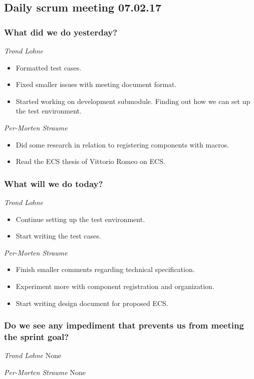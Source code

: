 \documentclass{article}
\begin{document}
\begin{center}
\subsection*{Daily scrum meeting 07.02.17}
\end{center}
\bigskip


\subsubsection*{What did we do yesterday?}

\noindent\textit{Trond Lohne}
\begin{itemize}
    \item
    Formatted test cases.

    \item
    Fixed smaller issues with meeting document format.

    \item
    Started working on development submodule. 
    Finding out how we can set up the test environment.
\end{itemize}

\medskip

\noindent\textit{Per-Morten Straume}
\begin{itemize}
    \item
    Did some research in relation to registering components with macros.

    \item
    Read the ECS thesis of Vittorio Romeo on ECS.
\end{itemize}


\subsubsection*{What will we do today?}

\noindent\textit{Trond Lohne}
\begin{itemize}
    \item
    Continue setting up the test environment.

    \item
    Start writing the test cases.
\end{itemize}

\medskip

\noindent\textit{Per-Morten Straume}
\begin{itemize}
    \item
    Finish smaller comments regarding technical specification.

    \item
    Experiment more with component registration and organization.

    \item
    Start writing design document for proposed ECS.
\end{itemize}

\subsubsection*{Do we see any impediment that prevents us from meeting the sprint goal?}

\noindent\textit{Trond Lohne}
None

\medskip

\noindent\textit{Per-Morten Straume}
None
\end{document}
